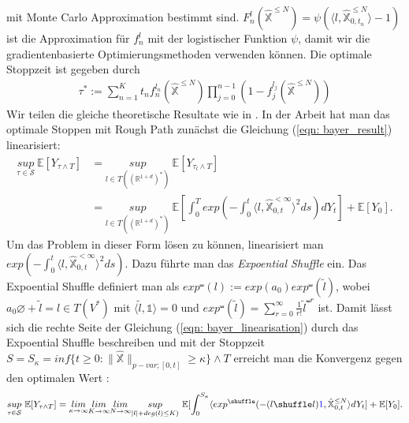 \documentclass[12pt,titlepage,headsepline]{article}
\begin{document}
    mit Monte Carlo Approximation bestimmt sind. $F_n^l(\hat{\mathbb{X}}^{\leq N}) = \psi( \langle l, \hat{\mathbb{X}}^{\leq N}_{0,t_n} \rangle - 1)$ ist die Approximation für $f_n^l$ mit der logistischer Funktion $\psi$, damit wir die gradientenbasierte Optimierungsmethoden verwenden können. Die optimale Stoppzeit ist gegeben durch
    \begin{align*}
      \tau^* := \sum_{n=1}^K t_nf_n^{l_n}(\hat{\mathbb{X}}^{\leq N})\prod_{j=0}^{n-1}(1-f_j^{l_j}(\hat{\mathbb{X}}^{\leq N}))
    \end{align*}
    \hfill\break
    Wir teilen die gleiche theoretische Resultate wie in \cite{bayer_optimal_2020}. In der Arbeit hat man das optimale Stoppen mit Rough Path zunächst die Gleichung (\ref{eqn: bayer_result}) linearisiert:
    \begin{align}\label{eqn: bayer_linearisation}
       \underset{\tau \in \mathcal{S}}{sup} \ \mathbb{E}[Y_{\tau \land T}] &= \underset{l \in T((\mathbb{R}^{1+d})^*)}{sup} \ \mathbb{E}[Y_{\tau_l \land T}] \\
       &= \underset{l \in T((\mathbb{R}^{1+d})^*)}{sup} \ \mathbb{E}[\int_0^T exp(-\int_0^t \langle l,\hat{\mathbb{X}}^{<\infty}_{0,t}\rangle ^2 ds) dY_t] + \mathbb{E}[Y_0].
    \end{align}
    Um das Problem in dieser Form lösen zu können, linearisiert man $exp(-\int_0^t \langle l,\hat{\mathbb{X}}^{<\infty}_{0,t}\rangle ^2 ds)$. Dazu führte man das \textit{Expoential Shuffle} ein. Das Expoential Shuffle definiert man als $exp^{\shuffle}(l):=exp(a_0)exp^{\shuffle}(\tilde{l})$, wobei $a_0\varnothing + \tilde{l} = l \in T(V^*)$ mit
    $\langle \tilde{l}, \mathds{1} \rangle = 0$ und $exp^{\shuffle}(\tilde{l}) = \sum_{r=0}^{\infty}\frac{1}{r!}\tilde{l}^{\shuffle r}$ ist. Damit lässt sich die rechte Seite der Gleichung (\ref{eqn: bayer_linearisation}) durch das Expoential Shuffle beschreiben und mit der Stoppzeit
    $S = S_{\kappa}=inf\{t \geq 0 : \lVert \hat{\mathbb{X}} \rVert_{p-var;[0,t]} \geq \kappa\}\wedge T$
    erreicht man die Konvergenz gegen den optimalen Wert \cite{bayer_optimal_2020,Prop.6.5}:
    \begin{align*}
      \underset{\tau \in \mathcal{S}}{sup} \ \mathbb{E}[Y_{\tau \land T}] = \underset{\kappa \rightarrow \infty}{lim} \underset{K \rightarrow \infty}{lim} \underset{N \rightarrow \infty}{lim} \underset{\lvert l \rvert + deg(l) \leq K)}{sup} \ \mathbb{E}[\int_0^{S_{\kappa}} \langle exp^{\shuffle}(-(l \shuffle l)\textcolor{blue}{1},\hat{\mathbb{X}}^{\leq N}_{0,t}\rangle dY_t] + \mathbb{E}[Y_0].
    \end{align*}
\end{document}
